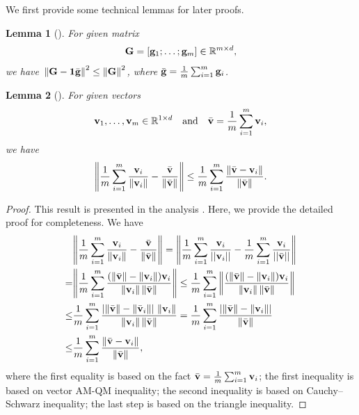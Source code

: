 \documentclass[sigconf]{acmart}
\newcommand{\Norm}[1]{\left\| #1 \right\|}
\def\vone{{\bf{1}}}
\def\vg{{\bf{g}}}
\def\vv{{\bf{v}}}
\def\BR{{\mathbb{R}}}
\def\mG {{\bf G}}
\theoremstyle{plain}
\newtheorem{lem}{Lemma}
\def\bg{{\bar\vg}}
\def\bv{{\bar\vv}}
\begin{document}
We first provide some technical lemmas for later proofs.

\begin{lem}[{\citet[Lemma 12]{ye2023multi}}]\label{lem:vector-mean}
For given matrix 
\begin{align*}
\mG=[\vg_1;\dots;\vg_m]\in\BR^{m\times d},     
\end{align*}
we have~$\Norm{\mG - \vone\bg}^2 \leq \Norm{\mG}^2$, where $\bg=\frac{1}{m}\sum_{i=1}^m \vg_i$.
\end{lem}

\begin{lem}[{\citet[Lemma B.5]{li2024problem}}]
For given vectors 
\begin{align*}
\vv_1,\dots,\vv_m\in\BR^{1\times d} \quad\text{and}\quad \bv=\frac{1}{m}\sum_{i=1}^m\vv_i,     
\end{align*}
we have    
\begin{align}\label{eq:consensus-error-1}
    \Norm{\frac{1}{m}\sum_{i=1}^m \frac{\vv_i}{\Norm{\vv_i}} - \frac{\bv}{\Norm{\bv}}} 
\leq \frac{1}{m}\sum_{i=1}^m \frac{\Norm{\bv - \vv_i}}{\Norm{\bv}}. 
\end{align}
\end{lem}
\begin{proof}
This result is presented in the analysis \citet[Lemma B.5]{li2024problem}. 
Here, we provide the detailed proof for completeness. We have
\begin{align*}
& {\Norm{\frac{1}{m}\sum_{i=1}^m \frac{\vv_i}{\Norm{\vv_i}} - \frac{\bv}{\Norm{\bv}}} 
= \Norm{\frac{1}{m}\sum_{i=1}^m \frac{\vv_i}{||\vv_i||} - \frac{1}{m}\sum_{i=1}^m\frac{\vv_i}{||\bar \vv||}}} \\
{=} & {\Norm{\frac{1}{m}\sum_{i=1}^m \frac{(\Norm{\bv} - \Norm{\vv_i})\vv_i}{\Norm{\vv_i}\Norm{\bv}}}}  
\leq  \frac{1}{m}\sum_{i=1}^m\Norm{ \frac{(\Norm{\bv} - \Norm{\vv_i})\vv_i}{\Norm{\vv_i}\Norm{\bv}}}  \\
\leq & \frac{1}{m}\sum_{i=1}^m \frac{\left|\Norm{\bv} - \Norm{\bv_i}\right|\,\Norm{\vv_i}}{\Norm{\vv_i}\Norm{\bv}}  
= \frac{1}{m}\sum_{i=1}^m \frac{\left|\Norm{\bv} - \Norm{\vv_i}\right|}{\Norm{\bv}} \\
\leq & \frac{1}{m}\sum_{i=1}^m \frac{\Norm{\bv - \vv_i}}{\Norm{\bv}},
\end{align*}
where {the first equality is based on the fact $\bar\vv=\frac{1}{m}\sum_{i=1}^m \vv_i$}; the first inequality is based on vector AM-QM inequality; the second inequality is based on Cauchy--Schwarz inequality; the last step is based on the triangle inequality.
\end{proof}
\end{document}
